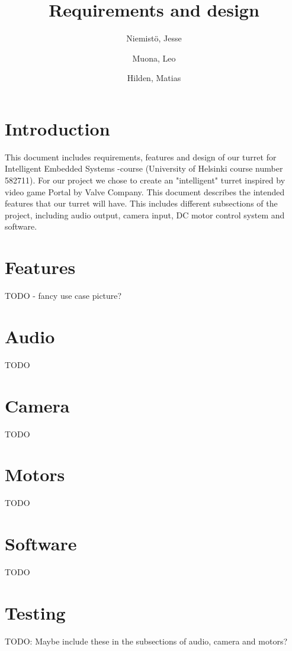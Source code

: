 \documentclass[english,11pt,twoside,a4paper]{article}
\begin{document}
\author{
  Niemistö, Jesse
  \and
  Muona, Leo
  \and
  Hilden, Matias
}
\title{Requirements and design}

\maketitle

\section{Introduction}
This document includes requirements, features and design of our turret for Intelligent Embedded Systems -course (University of Helsinki course number 582711). For our project we chose to create an "intelligent" turret inspired by video game Portal by Valve Company. This document describes the intended features that our turret will have. This includes different subsections of the project, including audio output, camera input, DC motor control system and software.

\section{Features}
TODO
- fancy use case picture?

\section{Audio}
TODO

\section{Camera}
TODO

\section{Motors}
TODO

\section{Software}
TODO

\section{Testing}
TODO: Maybe include these in the subsections of audio, camera and motors?
\end{document}
